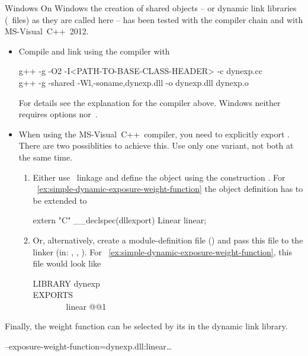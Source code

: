 \begin{restrictedmaterial}{Windows}
  \noindent On Windows the creation of shared objects -- or dynamic link libraries
  (~files) as they are called here -- has been tested with the 
  compiler chain and with MS-Visual~C++~2012.

  \begin{itemize}
  \item
    Compile and link using the  compiler with

    \begin{literal}
      g++ -g -O2 -I<PATH-TO-BASE-CLASS-HEADER> -c dynexp.cc \\
      g++ -g -shared -Wl,-soname,dynexp.dll -o dynexp.dll dynexp.o
    \end{literal}

    For details see the explanation for the  compiler above.  Windows neither
    requires options  nor~.

  \item
    When using the MS-Visual~C++~compiler, you need to explicitly export .
    There are two possiblities to achieve this.  Use only one variant, not both at the same
    time.

    \begin{enumerate}
    \item
      Either use ~linkage and define the object using the construction
      .  For
      \exampleName~\ref{ex:simple-dynamic-exposure-weight-function} the object definition has to
      be extended to

      \begin{cxxlisting}
extern "C"
{
  __declspec(dllexport) Linear linear;
}
      \end{cxxlisting}

    \item
      Or, alternatively, create a module-definition file () and pass this file to
      the linker (in: , , ).  For \exampleName~\ref{ex:simple-dynamic-exposure-weight-function},
      this file would look like

      \begin{literal}
        LIBRARY dynexp \\
        EXPORTS \\
        ~~~~~~~~linear @@1 \\
      \end{literal}
    \end{enumerate}
  \end{itemize}

  Finally, the weight function can be selected by its  in the dynamic link
  library.

  \begin{literal}
    \app{} --exposure-weight-function=dynexp.dll:linear\dots
  \end{literal}
\end{restrictedmaterial}


